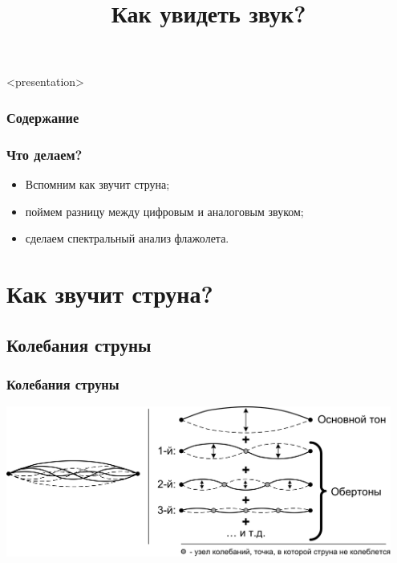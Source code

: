 

\title[Как увидеть звук?]{Как увидеть звук?}



\begin{frame}<presentation>
    \frametitle{Содержание}
    \tableofcontents
\end{frame}

\begin{frame}
    \frametitle{Что делаем?}

	\begin{itemize}
		\item Вспомним как звучит струна;
		\item поймем разницу между цифровым и аналоговым звуком;
		\item сделаем спектральный анализ флажолета.
	\end{itemize}
\end{frame}


\section{Как звучит струна?}


\subsection{Колебания струны}

\begin{frame}
    \frametitle{Колебания струны}

    \begin{center}
        \includegraphics[width=0.95\textwidth]{figs/string-nodes}
    \end{center}
\end{frame}


